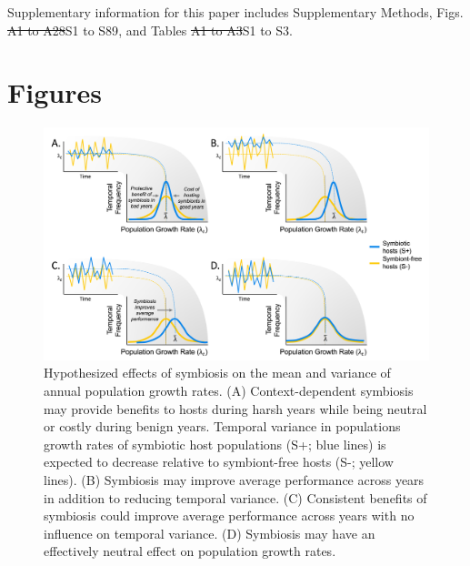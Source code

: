 \documentclass[lineno, sn-basic]{sn-jnl}%
\providecommand{\DIFadd}[1]{{\protect\color{blue}#1}} %
\providecommand{\DIFdel}[1]{{\protect\color{red}\protect\scriptsize\sout{#1}}}
\providecommand{\DIFadd}[1]{{\protect\color{blue}\uwave{#1}}} %
\providecommand{\DIFdel}[1]{{\protect\color{red}\sout{#1}}}                      %
\providecommand{\DIFaddbegin}{} %
\providecommand{\DIFaddend}{} %
\providecommand{\DIFdelbegin}{} %
\providecommand{\DIFdelend}{} %
\providecommand{\DIFaddbeginFL}{} %
\providecommand{\DIFaddendFL}{} %
\providecommand{\DIFdelbeginFL}{} %
\providecommand{\DIFdelendFL}{} %
\newcommand{\DIFscaledelfig}{0.5}
\newlength{\DIFdelgraphicswidth} %
\newlength{\DIFdelgraphicsheight} %
\newcommand{\DIFaddincludegraphics}[2][]{{\color{blue}\fbox{\DIFOincludegraphics[#1]{#2}}}} %
\newcommand{\DIFdelincludegraphics}[2][]{%
\sbox{\DIFdelgraphicsbox}{\DIFOincludegraphics[#1]{#2}}%
\settoboxwidth{\DIFdelgraphicswidth}{\DIFdelgraphicsbox} %
\settoboxtotalheight{\DIFdelgraphicsheight}{\DIFdelgraphicsbox} %
\scalebox{\DIFscaledelfig}{%
\parbox[b]{\DIFdelgraphicswidth}{\usebox{\DIFdelgraphicsbox}\\[-\baselineskip] \rule{\DIFdelgraphicswidth}{0em}}\llap{\resizebox{\DIFdelgraphicswidth}{\DIFdelgraphicsheight}{%
\setlength{\unitlength}{\DIFdelgraphicswidth}%
\begin{picture}(1,1)%
\thicklines\linethickness{2pt} %
{\color[rgb]{1,0,0}\put(0,0){\framebox(1,1){}}}%
{\color[rgb]{1,0,0}\put(0,0){\line( 1,1){1}}}%
{\color[rgb]{1,0,0}\put(0,1){\line(1,-1){1}}}%
\end{picture}%
}\hspace*{3pt}}} %
} %
\DeclareRobustCommand{\DIFaddbegin}{\DIFOaddbegin \let\includegraphics\DIFaddincludegraphics} %
\DeclareRobustCommand{\DIFaddend}{\DIFOaddend \let\includegraphics\DIFOincludegraphics} %
\DeclareRobustCommand{\DIFdelbegin}{\DIFOdelbegin \let\includegraphics\DIFdelincludegraphics} %
\DeclareRobustCommand{\DIFdelend}{\DIFOaddend \let\includegraphics\DIFOincludegraphics} %
\DeclareRobustCommand{\DIFaddbeginFL}{\DIFOaddbeginFL \let\includegraphics\DIFaddincludegraphics} %
\DeclareRobustCommand{\DIFaddendFL}{\DIFOaddendFL \let\includegraphics\DIFOincludegraphics} %
\DeclareRobustCommand{\DIFdelbeginFL}{\DIFOdelbeginFL \let\includegraphics\DIFdelincludegraphics} %
\DeclareRobustCommand{\DIFdelendFL}{\DIFOaddendFL \let\includegraphics\DIFOincludegraphics} %
\begin{document}
 Supplementary information for this paper includes Supplementary Methods, Figs. \DIFdelbegin \DIFdel{A1 to A28}\DIFdelend \DIFaddbegin \DIFadd{S1 to S89}\DIFaddend , and Tables \DIFdelbegin \DIFdel{A1 to A3}\DIFdelend \DIFaddbegin \DIFadd{S1 to S3}\DIFaddend . 





\DIFaddbegin 



\DIFaddend \clearpage


\section*{Figures}

\begin{figure}[h]
	\centering
	\includegraphics[width=\linewidth]{StochDemo_new_Fig1.png}
	\DIFdelbeginFL %
\DIFdelendFL \DIFaddbeginFL \caption[Hypothesized effects of symbiosis on the mean and variance of annual population growth rates]{\DIFaddendFL Hypothesized effects of symbiosis on the mean and variance of annual population growth rates. (A) Context-dependent symbiosis may provide benefits to hosts during harsh years while being neutral or costly during benign years.  Temporal variance in populations growth rates of symbiotic host populations (S+; blue lines) is expected to decrease relative to symbiont-free hosts (S-; yellow lines). (B) Symbiosis may improve average performance across years in addition to reducing temporal variance. (C) Consistent benefits of symbiosis could improve average performance across years with no influence on temporal variance. (D) Symbiosis may have an effectively neutral effect on population growth rates.}
\end{figure}
\end{document}
